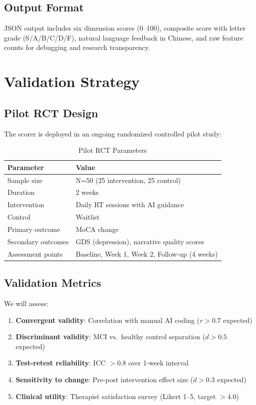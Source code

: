 \documentclass[11pt]{article}
\begin{document}
\subsection{Output Format}

JSON output includes six dimension scores (0--100), composite score with letter grade (S/A/B/C/D/F), natural language feedback in Chinese, and raw feature counts for debugging and research transparency.


\section{Validation Strategy}\label{sec:validation}

\subsection{Pilot RCT Design}

The scorer is deployed in an ongoing randomized controlled pilot study:

\begin{table}[h]
\centering
\caption{Pilot RCT Parameters}
\label{tab:rct}
\begin{tabular}{ll}
\toprule
\textbf{Parameter} & \textbf{Value} \\
\midrule
Sample size & N=50 (25 intervention, 25 control) \\
Duration & 2 weeks \\
Intervention & Daily RT sessions with AI guidance \\
Control & Waitlist \\
Primary outcome & MoCA change \\
Secondary outcomes & GDS (depression), narrative quality scores \\
Assessment points & Baseline, Week 1, Week 2, Follow-up (4 weeks) \\
\bottomrule
\end{tabular}
\end{table}

\subsection{Validation Metrics}

We will assess:
\begin{enumerate}[label=(\arabic*)]
    \item \textbf{Convergent validity}: Correlation with manual AI coding ($r > 0.7$ expected)
    \item \textbf{Discriminant validity}: MCI vs.\ healthy control separation ($d > 0.5$ expected)
    \item \textbf{Test-retest reliability}: ICC $> 0.8$ over 1-week interval
    \item \textbf{Sensitivity to change}: Pre-post intervention effect size ($d > 0.3$ expected)
    \item \textbf{Clinical utility}: Therapist satisfaction survey (Likert 1--5, target $>4.0$)
\end{enumerate}
\end{document}
